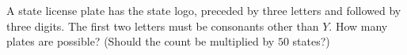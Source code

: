 A state license plate has the state logo, preceded by three letters and followed by three digits. The first two letters must be consonants other than $Y$. How many plates are possible? (Should the count be multiplied by $50$ states?)
